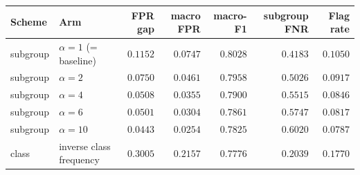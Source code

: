\begin{tabular}{llrrrrr}
\toprule
Scheme & Arm & FPR gap & macro FPR & macro-F1 & subgroup FNR & Flag rate \\
\midrule
subgroup & $\alpha = 1$ (= baseline) & $0.1152$ & $0.0747$ & $0.8028$ & $0.4183$ & $0.1050$ \\
subgroup & $\alpha = 2$ & $0.0750$ & $0.0461$ & $0.7958$ & $0.5026$ & $0.0917$ \\
subgroup & \textbf{$\alpha = 4$} & $0.0508$ & $0.0355$ & $0.7900$ & $0.5515$ & $0.0846$ \\
subgroup & $\alpha = 6$ & $0.0501$ & $0.0304$ & $0.7861$ & $0.5747$ & $0.0817$ \\
subgroup & $\alpha = 10$ & $0.0443$ & $0.0254$ & $0.7825$ & $0.6020$ & $0.0787$ \\
\addlinespace
class & inverse class frequency & $0.3005$ & $0.2157$ & $0.7776$ & $0.2039$ & $0.1770$ \\
\bottomrule
\end{tabular}
